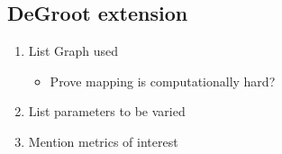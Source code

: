 \subsection{DeGroot extension}
\begin{enumerate}
	\item List Graph used
	      \begin{itemize}
		      \item Prove mapping is computationally hard?
	      \end{itemize}
	\item List parameters to be varied
	\item Mention metrics of interest

\end{enumerate}



